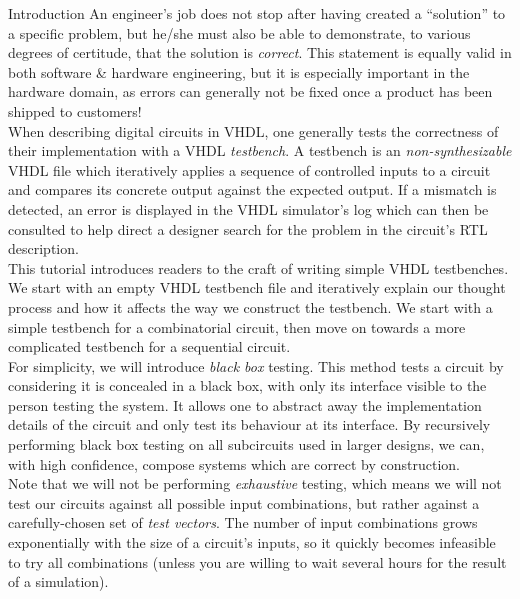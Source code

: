 \documentclass[lab]{course}
\begin{document}
\begin{section}{Introduction}
    An engineer's job does not stop after having created a ``solution'' to a specific problem, but he/she must also be able to demonstrate, to various degrees of certitude, that the solution is \emph{correct}. This statement is equally valid in both software \& hardware engineering, but it is especially important in the hardware domain, as errors can generally not be fixed once a product has been shipped to customers! \\

    When describing digital circuits in VHDL, one generally tests the correctness of their implementation with a VHDL \emph{testbench}. A testbench is an \emph{non-synthesizable} VHDL file which iteratively applies a sequence of controlled inputs to a circuit and compares its concrete output against the expected output. If a mismatch is detected, an error is displayed in the VHDL simulator's log which can then be consulted to help direct a designer search for the problem in the circuit's RTL description. \\

    This tutorial introduces readers to the craft of writing simple VHDL testbenches. We start with an empty VHDL testbench file and iteratively explain our thought process and how it affects the way we construct the testbench. We start with a simple testbench for a combinatorial circuit, then move on towards a more complicated testbench for a sequential circuit. \\

    For simplicity, we will introduce \emph{black box} testing. This method tests a circuit by considering it is concealed in a black box, with only its interface visible to the person testing the system. It allows one to abstract away the implementation details of the circuit and only test its behaviour at its interface. By recursively performing black box testing on all subcircuits used in larger designs, we can, with high confidence, compose systems which are correct by construction. \\

    Note that we will not be performing \emph{exhaustive} testing, which means we will not test our circuits against all possible input combinations, but rather against a carefully-chosen set of \emph{test vectors}. The number of input combinations grows exponentially with the size of a circuit's inputs, so it quickly becomes infeasible to try all combinations (unless you are willing to wait several hours for the result of a simulation).
\end{section}
\end{document}
